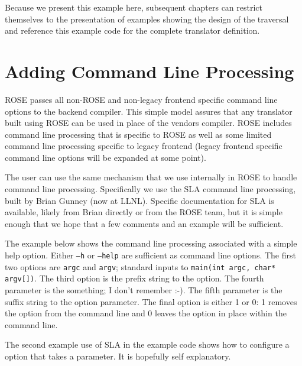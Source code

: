 Because we present this example here, subsequent chapters can restrict themselves to
the presentation of examples showing the design of the traversal and reference this
example code for the complete translator definition.

\section{Adding Command Line Processing}

   ROSE passes all non-ROSE and non-legacy frontend specific command line options to the backend
compiler.  This simple model assures that any translator built using ROSE can be used
in place of the vendors compiler. ROSE includes command line processing that is 
specific to ROSE as well as some limited command line processing specific to legacy frontend
(legacy frontend specific command line options will be expanded at some point).

   The user can use the same mechanism that we use internally in ROSE to handle command
line processing.  Specifically we use the SLA command line processing, built by Brian 
Gunney (now at LLNL).  Specific documentation for SLA is available, likely from Brian 
directly or from the ROSE team, but it is simple enough that we hope that a few comments and
an example will be sufficient.

   The example below shows the command line processing associated with a simple
help option.  Either {\tt --h} or {\tt --help} are sufficient as command line options.
The first two options are {\tt argc} and {\tt argv}; standard inputs to 
{\tt main(int argc, char* argv[])}.  The third option is the prefix string to the option.
The fourth parameter is the something; I don't remember :-).
The fifth parameter is the suffix string to the option parameter.
The final option is either 1 or 0: 1 removes the option from the command line and 0 leaves
the option in place within the command line.

The second example use of SLA in the example code shows how to configure a option that
takes a parameter. It is hopefully self explanatory.

